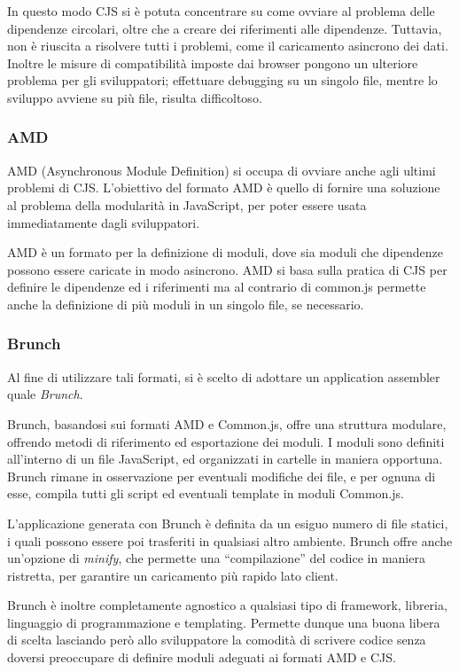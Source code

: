 In questo modo CJS si è potuta concentrare su come ovviare al problema delle dipendenze circolari, oltre che a creare dei riferimenti alle dipendenze. Tuttavia, non è riuscita a risolvere tutti i problemi, come il caricamento asincrono dei dati. Inoltre le misure di compatibilità imposte dai browser pongono un ulteriore problema per gli sviluppatori; effettuare debugging su un singolo file, mentre lo sviluppo avviene su più file, risulta difficoltoso.
\subsubsection{AMD} %
\label{ssub:amd}
AMD (Asynchronous Module Definition) si occupa di ovviare anche agli ultimi problemi di CJS. L'obiettivo del formato AMD è quello di fornire una soluzione al problema della modularità in JavaScript, per poter essere usata immediatamente dagli sviluppatori.

AMD è un formato per la definizione di moduli, dove sia moduli che dipendenze possono essere caricate in modo asincrono. AMD si basa sulla pratica di CJS per definire le dipendenze ed i riferimenti ma al contrario di common.js permette anche la definizione di più moduli in un singolo file, se necessario.
\newpage
\subsubsection{Brunch} %
\label{ssub:brunch_io}
Al fine di utilizzare tali formati, si è scelto di adottare un application assembler quale {\itshape Brunch}.

Brunch, basandosi sui formati AMD e Common.js, offre una struttura modulare, offrendo metodi di riferimento ed esportazione dei moduli. I moduli sono definiti all'interno di un file JavaScript, ed organizzati in cartelle in maniera opportuna. Brunch rimane in osservazione per eventuali modifiche dei file, e per ognuna di esse, compila tutti gli script ed eventuali template in moduli Common.js.

L'applicazione generata con Brunch è definita da un esiguo numero di file statici, i quali possono essere poi trasferiti in qualsiasi altro ambiente. Brunch offre anche un'opzione di {\itshape minify}, che permette una ``compilazione'' del codice in maniera ristretta, per garantire un caricamento più rapido lato client.

Brunch è inoltre completamente agnostico a qualsiasi tipo di framework, libreria, linguaggio di programmazione e templating. Permette dunque una buona libera di scelta lasciando però allo sviluppatore la comodità di scrivere codice senza doversi preoccupare di definire moduli adeguati ai formati AMD e CJS.

